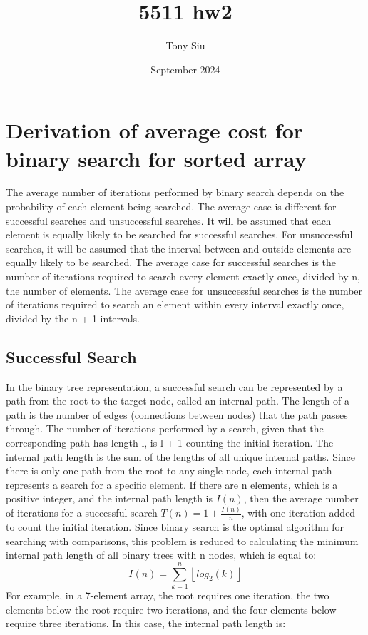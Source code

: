 \documentclass{article}
\title{5511 hw2}
\author{Tony Siu}
\date{September 2024}
\begin{document}
\maketitle

\section{Derivation of average cost for binary search for sorted array \cite{Knuth1998}\cite{chatgpt2024}}

The average number of iterations performed by binary search depends on the probability of each element being searched. The average case is different for successful searches and unsuccessful searches. It will be assumed that each element is equally likely to be searched for successful searches. For unsuccessful searches, it will be assumed that the interval between and outside elements are equally likely to be searched. The average case for successful searches is the number of iterations required to search every element exactly once, divided by n, the number of elements. The average case for unsuccessful searches is the number of iterations required to search an element within every interval exactly once, divided by the n + 1 intervals.

\subsection{Successful Search}

In the binary tree representation, a successful search can be represented by a path from the root to the target node, called an internal path. The length of a path is the number of edges (connections between nodes) that the path passes through. The number of iterations performed by a search, given that the corresponding path has length l, is l + 1 counting the initial iteration. The internal path length is the sum of the lengths of all unique internal paths. Since there is only one path from the root to any single node, each internal path represents a search for a specific element. If there are n elements, which is a positive integer, and the internal path length is $I(n)$, then the average number of iterations for a successful search $T(n) = 1 + \frac{I(n)}{n}$, with one iteration added to count the initial iteration. Since binary search is the optimal algorithm for searching with comparisons, this problem is reduced to calculating the minimum internal path length of all binary trees with n nodes, which is equal to: $$I(n) = \sum_{k=1}^n \left \lfloor {log_2 (k)}\right \rfloor$$
For example, in a 7-element array, the root requires one iteration, the two elements below the root require two iterations, and the four elements below require three iterations. In this case, the internal path length is:
\end{document}
